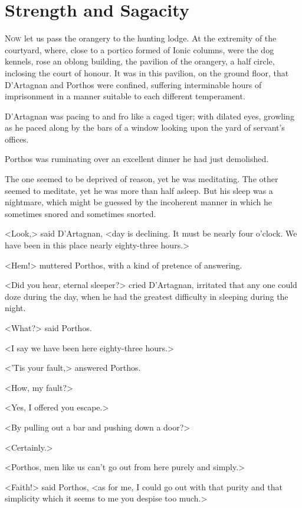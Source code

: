 \chapter{Strength and Sagacity}

 \lettrine{N}{ow} let us pass the orangery to the hunting lodge. At the extremity of the courtyard, where, close to a portico formed of Ionic columns, were the dog kennels, rose an oblong building, the pavilion of the orangery, a half circle, inclosing the court of honour. It was in this pavilion, on the ground floor, that D'Artagnan and Porthos were confined, suffering interminable hours of imprisonment in a manner suitable to each different temperament.

D'Artagnan was pacing to and fro like a caged tiger; with dilated eyes, growling as he paced along by the bars of a window looking upon the yard of servant's offices.

Porthos was ruminating over an excellent dinner he had just demolished.

The one seemed to be deprived of reason, yet he was meditating. The other seemed to meditate, yet he was more than half asleep. But his sleep was a nightmare, which might be guessed by the incoherent manner in which he sometimes snored and sometimes snorted.

<Look,> said D'Artagnan, <day is declining. It must be nearly four o'clock. We have been in this place nearly eighty-three hours.>

<Hem!> muttered Porthos, with a kind of pretence of answering.

<Did you hear, eternal sleeper?> cried D'Artagnan, irritated that any one could doze during the day, when he had the greatest difficulty in sleeping during the night.

<What?> said Porthos.

<I say we have been here eighty-three hours.>

<'Tis your fault,> answered Porthos.

<How, my fault?>

<Yes, I offered you escape.>

<By pulling out a bar and pushing down a door?>

<Certainly.>

<Porthos, men like us can't go out from here purely and simply.>

<Faith!> said Porthos, <as for me, I could go out with that purity and that simplicity which it seems to me you despise too much.>

